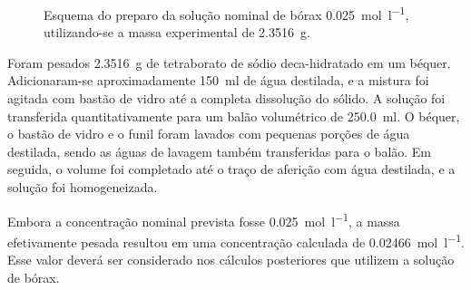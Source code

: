 \documentclass[a4paper,12pt]{article}
\begin{document}
\begin{figure}[H]
{%
}
\caption{Esquema do preparo da solução nominal de bórax \qty{0.025}{\mole\per\litre}, utilizando-se a massa experimental de \qty{2.3516}{\gram}.}
\label{fig:preparo_borax}
\end{figure}

Foram pesados \qty{2.3516}{\gram} de tetraborato de sódio deca-hidratado em um béquer. Adicionaram-se aproximadamente \qty{150}{\milli\litre} de água destilada, e a mistura foi agitada com bastão de vidro até a completa dissolução do sólido. A solução foi transferida quantitativamente para um balão volumétrico de \qty{250.0}{\milli\litre}. O béquer, o bastão de vidro e o funil foram lavados com pequenas porções de água destilada, sendo as águas de lavagem também transferidas para o balão. Em seguida, o volume foi completado até o traço de aferição com água destilada, e a solução foi homogeneizada.

\begin{tcolorbox}[
  title=Concentração da solução preparada,
  colback=quadrocinza,
  colframe=black!65,
  boxrule=0.6pt,
  arc=1mm
]
Embora a concentração nominal prevista fosse \qty{0.025}{\mole\per\litre}, a massa efetivamente pesada resultou em uma concentração calculada de \qty{0.02466}{\mole\per\litre}. Esse valor deverá ser considerado nos cálculos posteriores que utilizem a solução de bórax.
\end{tcolorbox}

%
\end{document}
